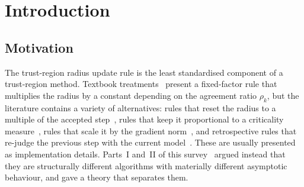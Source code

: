 \documentclass[11pt]{article}
\theoremstyle{plain}
\theoremstyle{definition}
\theoremstyle{remark}
\numberwithin{equation}{section}
\providecommand{\kbar}{\overline{\kappa}}
\providecommand{\kbar}{\overline{\kappa}}
\begin{document}

\providecommand{\provisional}{\textcolor{red}{\textsuperscript{\dag}}}
\providecommand{\PartI}{Part~I}
\providecommand{\PartII}{Part~II}


\section{Introduction}
\label{sec: introduction}

\subsection{Motivation}

The trust-region radius update rule is the least standardised component of a trust-region
method. Textbook treatments~\citep{ConnGoulToin00, NoceWrig06} present a fixed-factor rule that
multiplies the radius by a constant depending on the agreement ratio $\rho_k$, but the
literature contains a variety of alternatives: rules that reset the radius to a multiple of the
accepted step~\citep{Hei03, FanPan16}, rules that keep it proportional to a criticality
measure~\citep{ConnScheVice09_introduction}, rules that scale it by the gradient
norm~\citep{FanPan16, WangYuan2022, CurtSche20}, and retrospective rules that re-judge the
previous step with the current model~\citep{BastMalmMoufToinToma10}. These are usually presented
as implementation details. Parts~I and~II of this survey~\citep{Jeremy2026} argued instead that
they are structurally different algorithms with materially different asymptotic behaviour, and
gave a theory that separates them.
\end{document}
